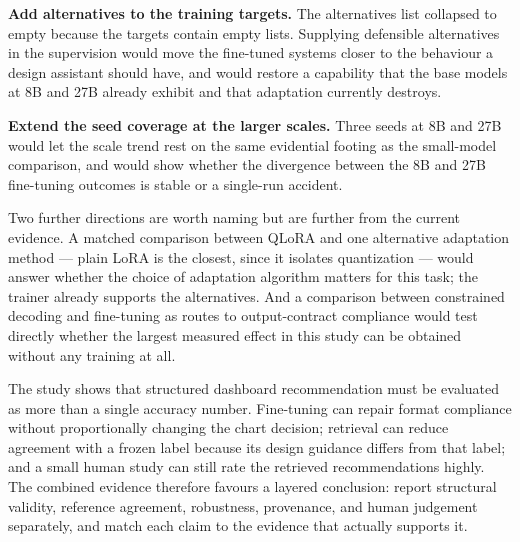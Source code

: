 \textbf{Add alternatives to the training targets.} The alternatives list collapsed to empty because the targets contain empty lists. Supplying defensible alternatives in the supervision would move the fine-tuned systems closer to the behaviour a design assistant should have, and would restore a capability that the base models at 8B and 27B already exhibit and that adaptation currently destroys.

\textbf{Extend the seed coverage at the larger scales.} Three seeds at 8B and 27B would let the scale trend rest on the same evidential footing as the small-model comparison, and would show whether the divergence between the 8B and 27B fine-tuning outcomes is stable or a single-run accident.

Two further directions are worth naming but are further from the current evidence. A matched comparison between QLoRA and one alternative adaptation method --- plain LoRA is the closest, since it isolates quantization --- would answer whether the choice of adaptation algorithm matters for this task; the trainer already supports the alternatives. And a comparison between constrained decoding and fine-tuning as routes to output-contract compliance would test directly whether the largest measured effect in this study can be obtained without any training at all.

The study shows that structured dashboard recommendation must be evaluated as more than a single accuracy number. Fine-tuning can repair format compliance without proportionally changing the chart decision; retrieval can reduce agreement with a frozen label because its design guidance differs from that label; and a small human study can still rate the retrieved recommendations highly. The combined evidence therefore favours a layered conclusion: report structural validity, reference agreement, robustness, provenance, and human judgement separately, and match each claim to the evidence that actually supports it.
